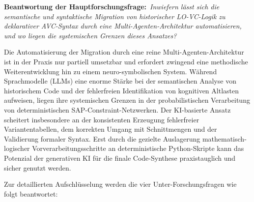 \textbf{Beantwortung der Hauptforschungsfrage:}\
\textit{Inwiefern lässt sich die semantische und syntaktische Migration von historischer LO-VC-Logik zu deklarativer AVC-Syntax durch eine Multi-Agenten-Architektur automatisieren, und wo liegen die systemischen Grenzen dieses Ansatzes?}

Die Automatisierung der Migration durch eine reine Multi-Agenten-Architektur ist in der Praxis nur partiell umsetzbar und erfordert zwingend eine methodische Weiterentwicklung hin zu einem neuro-symbolischen System. Während Sprachmodelle (\ac{LLMs}) eine enorme Stärke bei der semantischen Analyse von historischem Code und der fehlerfreien Identifikation von kognitiven Altlasten aufweisen, liegen ihre systemischen Grenzen in der probabilistischen Verarbeitung von deterministischen SAP-Constraint-Netzwerken. Der KI-basierte Ansatz scheitert insbesondere an der konsistenten Erzeugung fehlerfreier Variantentabellen, dem korrekten Umgang mit Schnittmengen und der Validierung formaler Syntax. Erst durch die gezielte Auslagerung mathematisch-logischer Vorverarbeitungsschritte an deterministische Python-Skripte kann das Potenzial der generativen \ac{KI} für die finale Code-Synthese praxistauglich und sicher genutzt werden.

Zur detaillierten Aufschlüsselung werden die vier Unter-Forschungsfragen wie folgt beantwortet:


